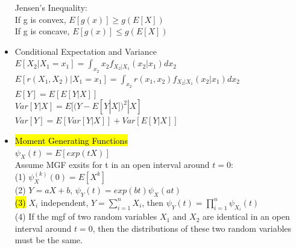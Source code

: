 \documentclass[a4paper,10pt]{article}
\begin{document}
\begin{multicols}{2}
\begin{itemize}
    Jensen's Inequality: \\If g is convex, $E[g(x)]\ge g(E[X])$\\
    If g is concave, $E[g(x)]\le g(E[X])$
    \item Conditional Expectation and Variance\\
    $E[X_2|X_1=x_1]=\int_{x_2}x_2f_{X_2|X_1}(x_2|x_1)dx_2$\\
    $E[r(X_1,X_2)|X_1=x_1]=\int_{x_2}r(x_1,x_2)f_{X_2|X_1}(x_2|x_1)dx_2$\\
    $E[Y]=E[E[Y|X]]$\\
    $Var[Y|X]=E[(Y-E[Y|X])^2|X]$\\
    $Var[Y]=E[Var[Y|X]]+Var[E[Y|X]]$
    \item \hl{Moment Generating Functions}\\
    $\psi_X(t)=E[exp(tX)]$\\
    Assume MGF exsits for t in an open interval around $t = 0$:\\
    (1) $\psi_X^{(k)}(0)=E[X^k]$\\
    (2) $Y=aX+b$, $\psi_Y(t)=exp(bt)\psi_X(at)$\\
    \hl{(3)} $X_i$ independent, $Y=\sum_{i=1}^n X_i$, then $\psi_Y(t)=\prod_{i=1}^n\psi_{X_i}(t)$\\
    (4) If the mgf of two random variables $X_1$ and $X_2$ are identical in an open
interval around $t = 0$, then the distributions of these two random variables must be the same.
\end{itemize}


\end{multicols}
\end{document}
